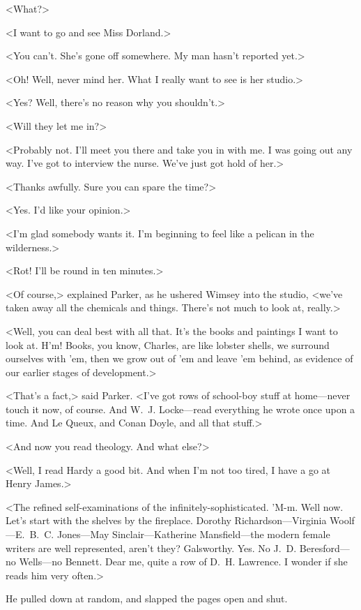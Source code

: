 <What?>

<I want to go and see Miss Dorland.>

<You can't. She's gone off somewhere. My man hasn't reported yet.>

<Oh! Well, never mind her. What I really want to see is her studio.>

<Yes? Well, there's no reason why you shouldn't.>

<Will they let me in?>

<Probably not. I'll meet you there and take you in with me. I was going out any way. I've got to interview the nurse. We've just got hold of her.>

<Thanks awfully. Sure you can spare the time?>

<Yes. I'd like your opinion.>

<I'm glad somebody wants it. I'm beginning to feel like a pelican in the wilderness.>

<Rot! I'll be round in ten minutes.>

<Of course,> explained Parker, as he ushered Wimsey into the studio, <we've taken away all the chemicals and things. There's not much to look at, really.>

<Well, you can deal best with all that. It's the books and paintings I want to look at. H'm! Books, you know, Charles, are like lobster shells, we surround ourselves with 'em, then we grow out of 'em and leave 'em behind, as evidence of our earlier stages of development.>

<That's a fact,> said Parker. <I've got rows of school-boy stuff at home—never touch it now, of course. And W\@.~J\@. Locke—read everything he wrote once upon a time. And Le Queux, and Conan Doyle, and all that stuff.>

<And now you read theology. And what else?>

<Well, I read Hardy a good bit. And when I'm not too tired, I have a go at Henry James.>

<The refined self-examinations of the infinitely-sophisticated. 'M-m. Well now. Let's start with the shelves by the fireplace. Dorothy Richardson—Virginia Woolf—E\@.~B\@.~C\@. Jones—May Sinclair—Katherine Mansfield—the modern female writers are well represented, aren't they? Galsworthy. Yes. No J\@.~D\@. Beresford—no Wells—no Bennett. Dear me, quite a row of D\@.~H\@. Lawrence. I wonder if she reads him very often.>

He pulled down  at random, and slapped the pages open and shut.


